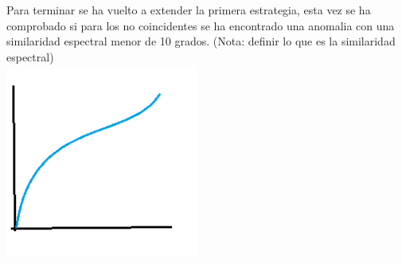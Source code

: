 \\
\\
Para terminar se ha vuelto a extender la primera estrategia, esta vez se ha comprobado si para los no coincidentes se ha encontrado una anomalia con una similaridad espectral menor de 10 grados. (Nota: definir lo que es la similaridad espectral)
\\
\includegraphics[height=2.5in]{figures/precision.png}
\\
\\